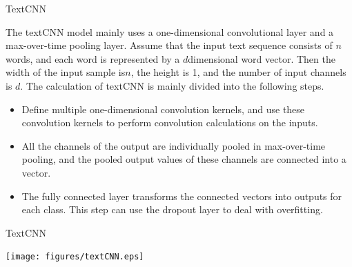 \documentclass[
 size=14pt,
 paper=smartboard,  %
 mode=present, 		%
 display=slides, 	%
 style=tuliplab,  	%
 pauseslide,
 fleqn,leqno]{powerdot}
\begin{document}
\begin{slide}{TextCNN}
	
The textCNN model mainly uses 
a one-dimensional convolutional layer and 
a max-over-time pooling layer. 
Assume that 
the input text sequence consists of $ n $ words, 
and each word is represented by 
a $ d  $dimensional word vector. 
Then the width of the input sample is$  n $, 
the height is 1, 
and the number of input channels is $ d $. 
The calculation of textCNN is mainly divided into the following steps.

\begin{itemize}
	\item 
	Define multiple one-dimensional convolution kernels, 
	and use these convolution kernels to 
	perform convolution calculations on the inputs. 
	\item 
	All the channels of the output are individually pooled 
	in max-over-time pooling, 
	and the pooled output values of 
	these channels are connected into a vector.
	\item 
	The fully connected layer transforms 
	the connected vectors into outputs for each class. 
	This step can use the dropout layer to deal with overfitting.
\end{itemize}

\end{slide}

\begin{slide}[toc=,bm=]{TextCNN}
	
\begin{center}
	\texttt{[image: figures/textCNN.eps]}
\end{center}	

\end{slide}


\end{document}

